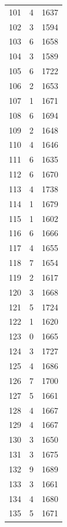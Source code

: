\documentclass[twocolumn, 11pt]{article} %
\begin{document}
\begin{longtable}{lll}
101       & 4        & 1637     \\
102       & 3        & 1594     \\
103       & 6        & 1658     \\
104       & 3        & 1589     \\
105       & 6        & 1722     \\
106       & 2        & 1653     \\
107       & 1        & 1671     \\
108       & 6        & 1694     \\
109       & 2        & 1648     \\
110       & 4        & 1646     \\
111       & 6        & 1635     \\
112       & 6        & 1670     \\
113       & 4        & 1738     \\
114       & 1        & 1679     \\
115       & 1        & 1602     \\
116       & 6        & 1666     \\
117       & 4        & 1655     \\
118       & 7        & 1654     \\
119       & 2        & 1617     \\
120       & 3        & 1668     \\
121       & 5        & 1724     \\
122       & 1        & 1620     \\
123       & 0        & 1665     \\
124       & 3        & 1727     \\
125       & 4        & 1686     \\
126       & 7        & 1700     \\
127       & 5        & 1661     \\
128       & 4        & 1667     \\
129       & 4        & 1667     \\
130       & 3        & 1650     \\
131       & 3        & 1675     \\
132       & 9        & 1689     \\
133       & 3        & 1661     \\
134       & 4        & 1680     \\
135       & 5        & 1671     \\

\end{longtable}
\end{document}
